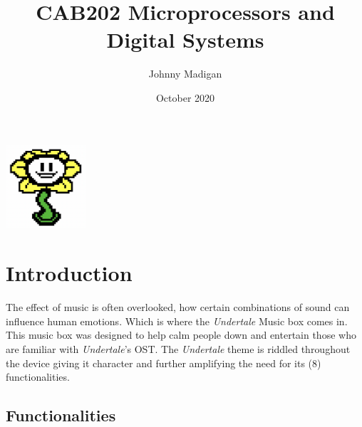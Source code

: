 \documentclass[a4paper]{article}
\title{CAB202 Microprocessors and Digital Systems\vspace{-3ex}}
\author{Johnny Madigan}
\date{\vspace{-3ex}October 2020\vspace{20ex}}
\begin{document}
\maketitle
\begin{center}
\includegraphics[width=3cm]{flower.png}
\end{center}
\newpage
\tableofcontents
\newpage

\section{Introduction}\label{sec:introduction}
\par The effect of music is often overlooked, how certain combinations of sound can influence human emotions. Which is where the \emph{Undertale} Music box comes in. This music box was designed to help calm people down and entertain those who are familiar with \emph{Undertale}'s OST. The \emph{Undertale} theme is riddled throughout the device giving it character and further amplifying the need for its (8) functionalities.

\subsection{Functionalities}
\end{document}
